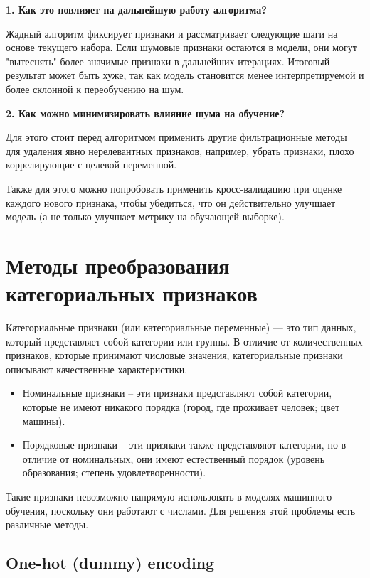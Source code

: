 \textbf{1. Как это повлияет на дальнейшую работу алгоритма?}

Жадный алгоритм фиксирует признаки и рассматривает следующие шаги на основе текущего набора. Если шумовые признаки остаются в модели, они могут "вытеснять" более значимые признаки в дальнейших итерациях.
Итоговый результат может быть хуже, так как модель становится менее интерпретируемой и более склонной к переобучению на шум.

\textbf{2. Как можно минимизировать влияние шума на обучение?}

Для этого стоит перед алгоритмом применить другие фильтрационные методы для удаления явно нерелевантных признаков, например, убрать признаки, плохо коррелирующие с целевой переменной.

Также для этого можно попробовать применить кросс-валидацию при оценке каждого нового признака, чтобы убедиться, что он действительно улучшает модель (а не только улучшает метрику на обучающей выборке).

\section{Методы преобразования категориальных признаков}

Категориальные признаки (или категориальные переменные) — это тип данных, который представляет собой категории или группы. В отличие от количественных признаков, которые принимают числовые значения, категориальные признаки описывают качественные характеристики.

\begin{itemize}
	\item Номинальные признаки -- эти признаки представляют собой категории, которые не имеют никакого порядка (город, где проживает человек; цвет машины).
	\item Порядковые признаки -- эти признаки также представляют категории, но в отличие от номинальных, они имеют естественный порядок (уровень образования; степень удовлетворенности).
\end{itemize}

Такие признаки невозможно напрямую использовать в моделях машинного обучения, поскольку они работают с числами. Для решения этой проблемы есть различные методы.

\subsection*{One-hot (dummy) encoding}

